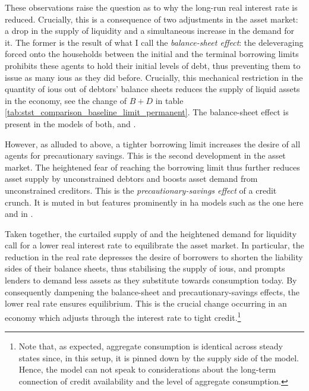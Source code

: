 \documentclass[a4paper,12pt]{article} %
\numberwithin{equation}{section} %
\numberwithin{figure}{section}
\numberwithin{table}{section}
\begin{document}
These observations raise the question as to why the long-run real interest rate is reduced. Crucially, this is a consequence of two adjustments in the asset market: a drop in the supply of liquidity and a simultaneous increase in the demand for it. The former is the result of what I call the \textit{balance-sheet effect}: the deleveraging forced onto the households between the initial and the terminal borrowing limits prohibits these agents to hold their initial levels of debt, thus preventing them to issue as many \Gls{iou}s as they did before. Crucially, this mechanical restriction in the quantity of \Gls{iou}s out of debtors' balance sheets reduces the supply of liquid assets in the economy, see the change of $B + D$ in table \ref{tab:stst_comparison_baseline_limit_permanent}. The balance-sheet effect is present in the models of both, \textcite{egg2012} and \textcite{gl2017}. 

However, as alluded to above, a tighter borrowing limit increases the desire of all agents for precautionary savings. This is the second development in the asset market. The heightened fear of reaching the borrowing limit thus further reduces asset supply by unconstrained debtors and boosts asset demand from unconstrained creditors. This is the \textit{precautionary-savings effect} of a credit crunch. It is muted in \textcite{egg2012} but features prominently in \Gls{ha} models such as the one here and in \textcite{gl2017}. 

Taken together, the curtailed supply of and the heightened demand for liquidity call for a lower real interest rate to equilibrate the asset market. In particular, the reduction in the real rate depresses the desire of borrowers to shorten the liability sides of their balance sheets, thus stabilising the supply of \Gls{iou}s, and prompts lenders to demand less assets as they substitute towards consumption today. By consequently dampening the balance-sheet and precautionary-savings effects, the lower real rate ensures equilibrium. This is the crucial change occurring in an economy which adjusts through the interest rate to tight credit.\footnote{Note that, as expected, aggregate consumption is identical across steady states since, in this setup, it is pinned down by the supply side of the model. Hence, the model can not speak to considerations about the long-term connection of credit availability and the level of aggregate consumption.}

\end{document}
